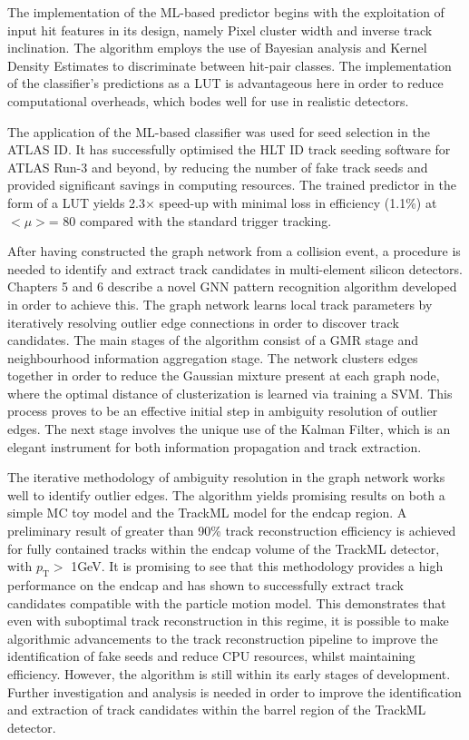 The implementation of the ML-based predictor begins with the exploitation of input hit features in its design, namely Pixel cluster width and inverse track inclination. The algorithm employs the use of Bayesian analysis and Kernel Density Estimates to discriminate between hit-pair classes. The implementation of the classifier’s predictions as a LUT is advantageous here in order to reduce computational overheads, which bodes well for use in realistic detectors.

The application of the ML-based classifier was used for seed selection in the ATLAS ID. It has successfully optimised the HLT ID track seeding software for ATLAS Run-3 and beyond, by reducing the number of fake track seeds and provided significant savings in computing resources. The trained predictor in the form of a LUT yields 2.3$\times$ speed-up with minimal loss in efficiency (1.1\%) at $< \mu >$= 80 compared with the standard trigger tracking. 





After having constructed the graph network from a collision event, a procedure is needed to identify and extract track candidates in multi-element silicon detectors. Chapters 5 and 6 describe a novel GNN pattern recognition algorithm developed in order to achieve this. The graph network learns local track parameters by iteratively resolving outlier edge connections in order to discover track candidates. The main stages of the algorithm consist of a GMR stage and neighbourhood information aggregation stage. The network clusters edges together in order to reduce the Gaussian mixture present at each graph node, where the optimal distance of clusterization is learned via training a SVM. This process proves to be an effective initial step in ambiguity resolution of outlier edges. The next stage involves the unique use of the Kalman Filter, which is an elegant instrument for both information propagation and track extraction. 

The iterative methodology of ambiguity resolution in the graph network works well to identify outlier edges. The algorithm yields promising results on both a simple MC toy model and the TrackML model for the endcap region. A preliminary result of greater than 90\% track reconstruction efficiency is achieved for fully contained tracks within the endcap volume of the TrackML detector, with $p_{\text{T}} >$ 1GeV. It is promising to see that this methodology provides a high performance on the endcap and has shown to successfully extract track candidates compatible with the particle motion model. This demonstrates that even with suboptimal track reconstruction in this regime, it is possible to make algorithmic advancements to the track reconstruction pipeline to improve the identification of fake seeds and reduce CPU resources, whilst maintaining efficiency. However, the algorithm is still within its early stages of development. Further investigation and analysis is needed in order to improve the identification and extraction of track candidates within the barrel region of the TrackML detector.



